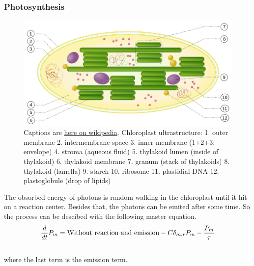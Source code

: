\documentclass[letterpaper,10pt,english]{sphinxmanual}
\begin{document}
\subsubsection{Photosynthesis}
\label{nonequilibrium/effectOfDefects:photosynthesis}\begin{figure}[htbp]
\centering
\capstart

\includegraphics{chloroplast.png}
\caption{Captions are \href{https://en.wikipedia.org/wiki/Photosynthesis\#mediaviewer/File:Chloroplast.svg}{here on wikipedia}. Chloroplast ultrastructure: 1. outer membrane 2. intermembrane space 3. inner membrane (1+2+3: envelope) 4. stroma (aqueous fluid) 5. thylakoid lumen (inside of thylakoid) 6. thylakoid membrane 7. granum (stack of thylakoids) 8. thylakoid (lamella) 9. starch 10. ribosome 11. plastidial DNA 12. plastoglobule (drop of lipids)}\end{figure}

The obsorbed energy of photons is random walking in the chloroplast until it hit on a reaction center. Besides that, the photons can be emited after some time. So the process can be descibed with the following master equation.
\begin{gather}
\begin{split}\frac{d}{dt} P_m = \text{Without reaction and emission} - C\delta_{m,r} P_m - \frac{P_m}{\tau}\end{split}\notag\\\begin{split}\end{split}\notag
\end{gather}
where the last term is the emission term.
\end{document}
